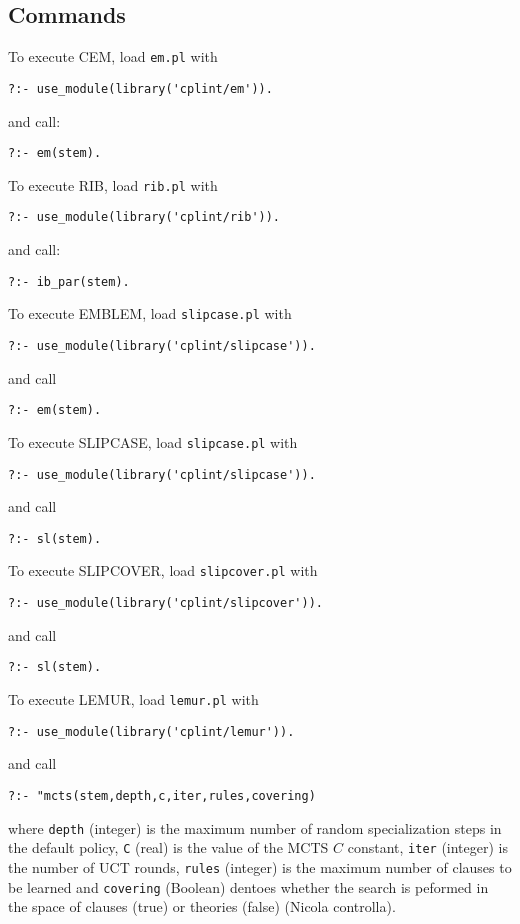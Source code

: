 \documentclass[a4paper,10pt]{scrartcl}
\begin{document}
\subsection{Commands}
To execute CEM, load \texttt{em.pl} with
\begin{verbatim}
?:- use_module(library('cplint/em')).
\end{verbatim}
and call:
\begin{verbatim}
?:- em(stem).
\end{verbatim}
To execute RIB, load \texttt{rib.pl} with
\begin{verbatim}
?:- use_module(library('cplint/rib')).
\end{verbatim}
and call:
\begin{verbatim}
?:- ib_par(stem).
\end{verbatim}
To execute EMBLEM, load \texttt{slipcase.pl} with
\begin{verbatim}
?:- use_module(library('cplint/slipcase')).
\end{verbatim}
and call
\begin{verbatim}
?:- em(stem).
\end{verbatim}
To execute SLIPCASE, load \texttt{slipcase.pl} with
\begin{verbatim}
?:- use_module(library('cplint/slipcase')).
\end{verbatim}
and call
\begin{verbatim}
?:- sl(stem).
\end{verbatim}
To execute SLIPCOVER, load \texttt{slipcover.pl} with
\begin{verbatim}
?:- use_module(library('cplint/slipcover')).
\end{verbatim}
and call
\begin{verbatim}
?:- sl(stem).
\end{verbatim}
To execute LEMUR, load \texttt{lemur.pl} with
\begin{verbatim}
?:- use_module(library('cplint/lemur')).
\end{verbatim}
and call
\begin{verbatim}
?:- "mcts(stem,depth,c,iter,rules,covering)
\end{verbatim}
where \verb|depth| (integer) is the maximum number
of random specialization steps in the default policy, \verb|C| (real) is the value of the MCTS $C$ constant, \verb|iter| (integer) is  the number of UCT rounds, \verb|rules| (integer) is
the maximum number  of clauses to be
learned and \verb|covering| (Boolean) dentoes whether the search is peformed in
the space of clauses (true) or theories (false) (Nicola controlla).
\end{document}
